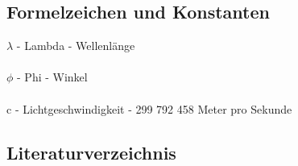 \documentclass[11pt]{scrartcl}
\begin{document}
\subsection{Formelzeichen und Konstanten}
$\lambda$ - Lambda - Wellenlänge\\
\\
$\phi$ - Phi - Winkel\\
\\
c - Lichtgeschwindigkeit - 299 792 458 Meter pro Sekunde
\clearpage

\subsection{Literaturverzeichnis}
\begingroup
\renewcommand{\section}[2]{}
\end{document}
